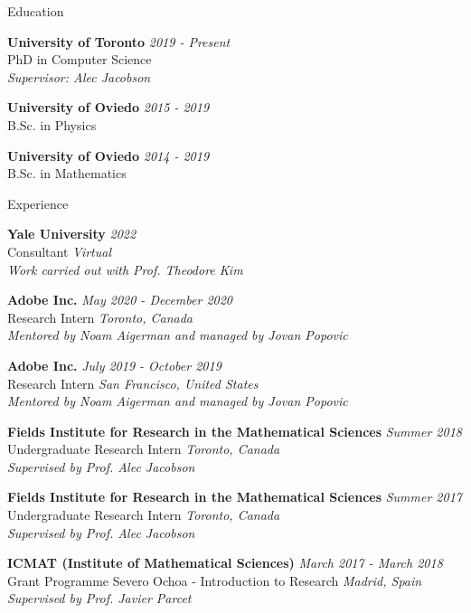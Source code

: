 \documentclass{resume} %
\begin{document}

\begin{rSection}{Education}

{\bf University of Toronto} \hfill {\em 2019 - Present} \\ 
PhD in Computer Science \\
{\it Supervisor: Alec Jacobson}

{\bf University of Oviedo} \hfill {\em 2015 - 2019} \\ 
B.Sc. in Physics 

{\bf University of Oviedo} \hfill {\em 2014 - 2019} \\ 
B.Sc. in Mathematics 

\end{rSection}


\begin{rSection}{Experience}

{\bf Yale University} \hfill {\em 2022} \\ 
Consultant \hfill {\em Virtual} \\
{\it Work carried out with Prof. Theodore Kim}

{\bf Adobe Inc.} \hfill {\em May 2020 - December 2020} \\ 
Research Intern \hfill {\em Toronto, Canada} \\
{\it Mentored by Noam Aigerman and managed by Jovan Popovic}

{\bf Adobe Inc.} \hfill {\em July 2019 - October 2019} \\ 
Research Intern \hfill {\em San Francisco, United States} \\
{\it Mentored by Noam Aigerman and managed by Jovan Popovic}

{\bf Fields Institute for Research in the Mathematical Sciences} \hfill {\em Summer 2018} \\ 
Undergraduate Research Intern \hfill {\em Toronto, Canada} \\
{\it Supervised by Prof. Alec Jacobson}

{\bf Fields Institute for Research in the Mathematical Sciences} \hfill {\em Summer 2017} \\ 
Undergraduate Research Intern \hfill {\em Toronto, Canada} \\
{\it Supervised by Prof. Alec Jacobson}

{\bf ICMAT (Institute of Mathematical Sciences)} \hfill {\em March 2017 - March 2018} \\ 
Grant Programme Severo Ochoa - Introduction to Research \hfill {\em Madrid, Spain} \\
{\it Supervised by Prof. Javier Parcet}

\end{rSection}
\end{document}
